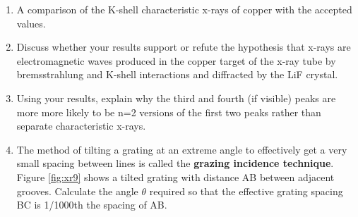 \begin{enumerate}[resume]
\item A comparison of the K-shell characteristic x-rays of copper with the accepted values.

\item Discuss whether your results support or refute the hypothesis that x-rays are electromagnetic waves produced in the copper target of the x-ray tube by bremsstrahlung and K-shell interactions and diffracted by the LiF crystal.

\item Using your results, explain why the third and fourth (if visible) peaks are more more likely to be n=2 versions of the first two peaks rather than separate characteristic x-rays.

\item The method of tilting a grating at an extreme angle to effectively get a very small spacing between lines is called the {\bf grazing incidence technique}. Figure \ref{fig:xr9} shows a tilted grating with distance AB between adjacent grooves. Calculate the angle $\theta$ required so that the effective grating spacing BC is 1/1000th the spacing of AB.

\end{enumerate}


\AtEndDocument{\clearpage\ifodd\value{page}\else\null\clearpage\fi} %



